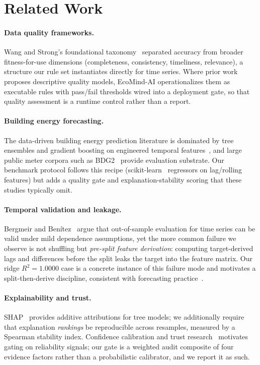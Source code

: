 \documentclass[conference]{IEEEtran}
\begin{document}
\section{Related Work}\label{sec:related}

\paragraph{Data quality frameworks.}
Wang and Strong's foundational taxonomy~\cite{wang:1996} separated accuracy from broader fitness-for-use dimensions (completeness, consistency, timeliness, relevance), a structure our rule set instantiates directly for time series. Where prior work proposes descriptive quality models, EcoMind-AI operationalizes them as executable rules with pass/fail thresholds wired into a deployment gate, so that quality assessment is a runtime control rather than a report.

\paragraph{Building energy forecasting.}
The data-driven building energy prediction literature is dominated by tree ensembles and gradient boosting on engineered temporal features~\cite{amasyali:2018, chen:2016, breiman:2001}, and large public meter corpora such as BDG2~\cite{miller:2020, miller:2020gep} provide evaluation substrate. Our benchmark protocol follows this recipe (scikit-learn~\cite{pedregosa:2011} regressors on lag/rolling features) but adds a quality gate and explanation-stability scoring that these studies typically omit.

\paragraph{Temporal validation and leakage.}
Bergmeir and Benítez~\cite{bergmeir:2012} argue that out-of-sample evaluation for time series can be valid under mild dependence assumptions, yet the more common failure we observe is not shuffling but \emph{pre-split feature derivation}: computing target-derived lags and differences before the split leaks the target into the feature matrix. Our ridge $R^2=1.0000$ case is a concrete instance of this failure mode and motivates a split-then-derive discipline, consistent with forecasting practice~\cite{hyndman:2021}.

\paragraph{Explainability and trust.}
SHAP~\cite{lundberg:2017} provides additive attributions for tree models; we additionally require that explanation \emph{rankings} be reproducible across resamples, measured by a Spearman stability index. Confidence calibration and trust research~\cite{guo:2017} motivates gating on reliability signals; our gate is a weighted audit composite of four evidence factors rather than a probabilistic calibrator, and we report it as such.
\end{document}
